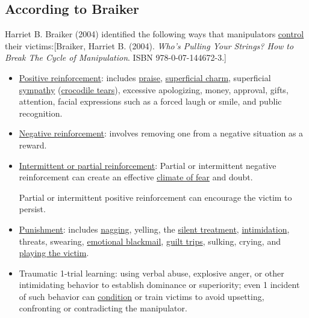 \documentclass{book}
\numberwithin{equation}{section}
\begin{document}
\subsection{According to Braiker}
Harriet B. Braiker (2004) identified the following ways that manipulators \href{https://en.wikipedia.org/wiki/Abusive_power_and_control}{control} their victims:[Braiker, Harriet B. (2004). \textit{Who's Pulling Your Strings? How to Break The Cycle of Manipulation}. ISBN 978-0-07-144672-3.]
\begin{itemize}
    \item \href{https://en.wikipedia.org/wiki/Positive_reinforcement}{Positive reinforcement}: includes \href{https://en.wikipedia.org/wiki/Praise}{praise}, \href{https://en.wikipedia.org/wiki/Superficial_charm}{superficial charm}, superficial \href{https://en.wikipedia.org/wiki/Sympathy}{sympathy} (\href{https://en.wikipedia.org/wiki/Crocodile_tears}{crocodile tears}), excessive apologizing, money, approval, gifts, attention, facial expressions such as a forced laugh or smile, and public recognition.
    \item \href{https://en.wikipedia.org/wiki/Negative_reinforcement}{Negative reinforcement}: involves removing one from a negative situation as a reward.
    \item \href{https://en.wikipedia.org/wiki/Reinforcement#Intermittent_reinforcement_schedules}{Intermittent or partial reinforcement}: Partial or intermittent negative reinforcement can create an effective \href{https://en.wikipedia.org/wiki/Climate_of_fear}{climate of fear} and doubt.
    
    Partial or intermittent positive reinforcement can encourage the victim to persist.
    \item \href{https://en.wikipedia.org/wiki/Punishment_(psychology)}{Punishment}: includes \href{https://en.wikipedia.org/wiki/Nagging}{nagging}, yelling, the \href{https://en.wikipedia.org/wiki/Silent_treatment}{silent treatment}, \href{https://en.wikipedia.org/wiki/Intimidation}{intimidation}, threats, swearing, \href{https://en.wikipedia.org/wiki/Emotional_blackmail}{emotional blackmail}, \href{https://en.wikipedia.org/wiki/Guilt_trip}{guilt trips}, sulking, crying, and \href{https://en.wikipedia.org/wiki/Playing_the_victim}{playing the victim}.
    \item Traumatic 1-trial learning: using verbal abuse, explosive anger, or other intimidating behavior to establish dominance or superiority; even 1 incident of such behavior can \href{https://en.wikipedia.org/wiki/Classical_conditioning}{condition} or train victims to avoid upsetting, confronting or contradicting the manipulator.
\end{itemize}
\end{document}
